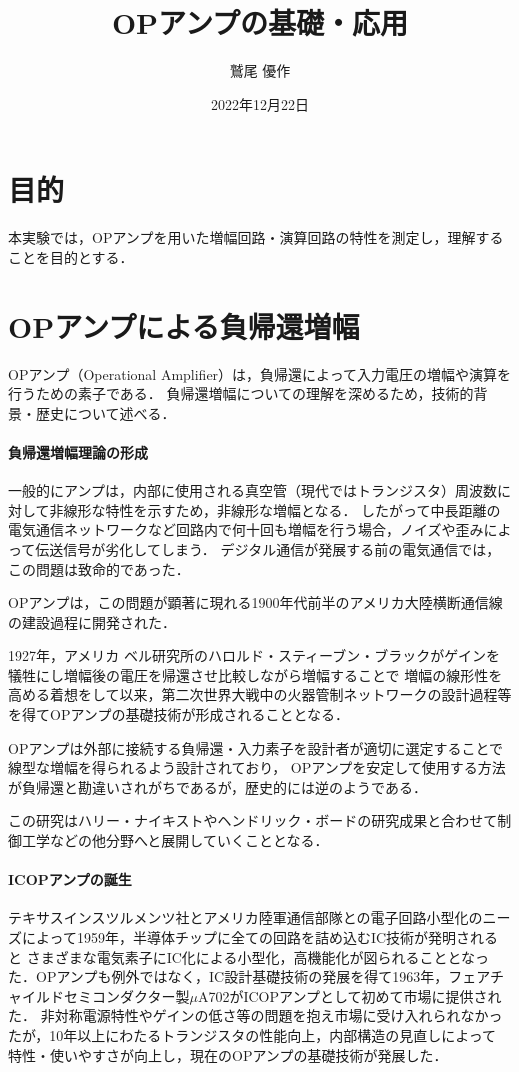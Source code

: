 \documentclass[dvipdfmx,titlepage,a4j]{jsarticle}  %
\title{OPアンプの基礎・応用}
\author{鷲尾 優作}
\date{2022年12月22日}
\begin{document}
\pagestyle{foot}

\maketitle

\section{目的}
本実験では，OPアンプを用いた増幅回路・演算回路の特性を測定し，理解することを目的とする．

\section{OPアンプによる負帰還増幅}
OPアンプ（Operational Amplifier）は，負帰還によって入力電圧の増幅や演算を行うための素子である．
負帰還増幅についての理解を深めるため，技術的背景・歴史について述べる．

\paragraph{負帰還増幅理論の形成\\}
一般的にアンプは，内部に使用される真空管（現代ではトランジスタ）周波数に対して非線形な特性を示すため，非線形な増幅となる．
したがって中長距離の電気通信ネットワークなど回路内で何十回も増幅を行う場合，ノイズや歪みによって伝送信号が劣化してしまう．
デジタル通信が発展する前の電気通信では，この問題は致命的であった．

OPアンプは，この問題が顕著に現れる1900年代前半のアメリカ大陸横断通信線の建設過程に開発された．

1927年，アメリカ ベル研究所のハロルド・スティーブン・ブラックがゲインを犠牲にし増幅後の電圧を帰還させ比較しながら増幅することで
増幅の線形性を高める着想をして以来，第二次世界大戦中の火器管制ネットワークの設計過程等を得てOPアンプの基礎技術が形成されることとなる．

OPアンプは外部に接続する負帰還・入力素子を設計者が適切に選定することで線型な増幅を得られるよう設計されており，
OPアンプを安定して使用する方法が負帰還と勘違いされがちであるが，歴史的には逆のようである．

この研究はハリー・ナイキストやヘンドリック・ボードの研究成果と合わせて制御工学などの他分野へと展開していくこととなる．

\paragraph{ICOPアンプの誕生\\}
テキサスインスツルメンツ社とアメリカ陸軍通信部隊との電子回路小型化のニーズによって1959年，半導体チップに全ての回路を詰め込むIC技術が発明されると
さまざまな電気素子にIC化による小型化，高機能化が図られることとなった．OPアンプも例外ではなく，IC設計基礎技術の発展を得て1963年，フェアチャイルドセミコンダクター製$\mu$A702がICOPアンプとして初めて市場に提供された．
非対称電源特性やゲインの低さ等の問題を抱え市場に受け入れられなかったが，10年以上にわたるトランジスタの性能向上，内部構造の見直しによって
特性・使いやすさが向上し，現在のOPアンプの基礎技術が発展した．
\end{document}
